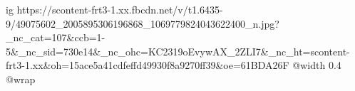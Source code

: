  
 
 
 
 

\ifcmt
  ig https://scontent-frt3-1.xx.fbcdn.net/v/t1.6435-9/49075602_2005895306196868_1069779824043622400_n.jpg?_nc_cat=107&ccb=1-5&_nc_sid=730e14&_nc_ohc=KC2319oEvywAX_2ZLI7&_nc_ht=scontent-frt3-1.xx&oh=15ace5a41cdfeffd49930f8a9270ff39&oe=61BDA26F
  @width 0.4
  @wrap 
\fi
